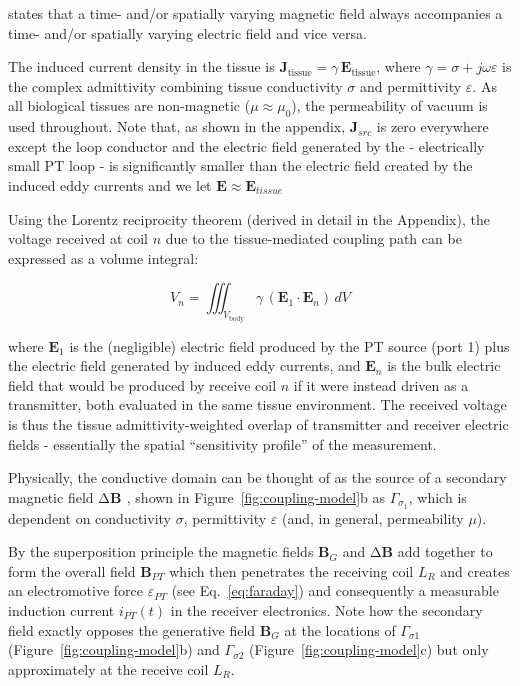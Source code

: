 \documentclass[
]{article}
\begin{document}
states that a time- and/or spatially varying magnetic field always
accompanies a time- and/or spatially varying electric field and vice
versa.

The induced current density in the tissue is $\mathbf{J}_{\text{tissue}} = \gamma\,\mathbf{E}_{\text{tissue}}$, where $\gamma = \sigma + j\omega\varepsilon$ is the complex admittivity combining tissue conductivity $\sigma$ and permittivity $\varepsilon$. As all biological tissues are non-magnetic ($\mu \approx \mu_0$), the permeability of vacuum is used throughout. Note that, as shown in the appendix, $\mathbf{J}_{src}$ is zero everywhere except the loop conductor and the electric field generated by the - electrically small PT loop - is significantly smaller than the electric field created by the induced eddy currents and we let $\mathbf{E} \approx \mathbf{E}_{tissue}$

Using the Lorentz reciprocity theorem (derived in detail in the Appendix), the voltage received at coil $n$ due to the tissue-mediated coupling path can be expressed as a volume integral:

\begin{equation}
\label{eq:vn-integral}
V_n = \iiint_{V_{\text{body}}} \gamma\,(\mathbf{E}_1 \cdot \mathbf{E}_n)\,dV
\end{equation}

where $\mathbf{E}_1$ is the (negligible) electric field produced by the PT source (port 1) plus the electric field generated by induced eddy currents, and $\mathbf{E}_n$ is the bulk electric field that would be produced by receive coil $n$ if it were instead driven as a transmitter, both evaluated in the same tissue environment. The received voltage is thus the tissue admittivity-weighted overlap of transmitter and receiver electric fields - essentially the spatial ``sensitivity profile'' of the measurement.

Physically, the conductive domain can be thought of as the source of a secondary
magnetic field $\mathbf{\mathrm{\Delta}B}_{}$ , shown in Figure~\ref{fig:coupling-model}b as $\Gamma_{\sigma_1}$,
which is dependent on conductivity $\sigma$, permittivity
$\varepsilon$ (and, in general, permeability $\mu$).

By the superposition principle the magnetic fields $\mathbf{B}_{G}$
and $\mathbf{\mathrm{\Delta}B}$ add together to form the overall field
$\mathbf{B}_{PT}$ which then penetrates the receiving coil $L_{R}$
and creates an electromotive force $\varepsilon_{PT}$ (see Eq.~\eqref{eq:faraday}) and
consequently a measurable induction current $i_{PT}(t)$ in the
receiver electronics. Note how the secondary field exactly opposes the
generative field $\mathbf{B}_{G}$ at the locations of
$\Gamma_{\sigma 1}$ (Figure~\ref{fig:coupling-model}b) and $\Gamma_{\sigma 2}$ (Figure~\ref{fig:coupling-model}c) but only
approximately at the receive coil $L_{R}$.
\end{document}
